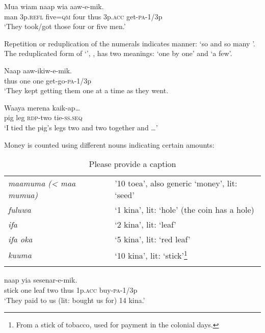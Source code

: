 \ea%
\label{ex:3:x92}
\gll Mua wiam   naap wia aaw-e-mik. \\
man 3p.\textsc{refl} five=\textsc{qm} four thus 3p.\textsc{acc} get-\textsc{pa}-1/3p\\
\glt`They took/got those four or five men.'
\z

Repetition  or reduplication  of the numerals indicates manner: `so and so many '. The reduplicated form of  `', , has two meanings: `one by one' and `a few'. 

\ea%
\label{ex:3:x93}
\gll Naap   aaw-ikiw-e-mik. \\
thus one one get-go-\textsc{pa}-1/3p\\
\glt`They kept getting them one at a time as they went.
\z

\ea%
\label{ex:3:x94}
\gll Waaya merena  kaik-ap{\dots} \\
pig leg \textsc{rdp}-two tie-\textsc{ss}.\textsc{seq}\\
\glt`I tied the pig's legs two and two together and {\dots}'
\z

Money is counted using different nouns indicating certain amounts:

\begin{table}
\caption{Please provide a caption}
\label{} 
\begin{tabular}{>{\itshape}ll}
\mytoprule
maamuma ({\textless} maa mumua) &'10 toea', also generic `money', lit: `seed'\\
fuluwa &`1 kina', lit: `hole' (the coin has a hole)\\
ifa &`2 kina', lit: `leaf'\\
ifa oka &`5 kina', lit: `red leaf'\\
kuuma &`10 kina', lit: `stick'\footnote{From a stick of tobacco, used for payment in the colonial days.} \\
\mybottomrule
\end{tabular}
\end{table}


\ea%
\label{ex:3:x97}
\gll {}    naap yia sesenar-e-mik. \\
stick one leaf two thus 1p.\textsc{acc} buy-\textsc{pa}-1/3p\\
\glt`They paid to us (lit: bought us for) 14 kina.' 
\z

